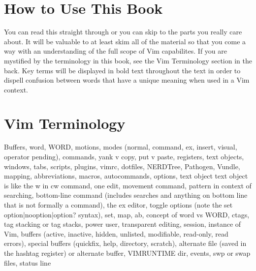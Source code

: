 \documentclass[12pt]{book}
\begin{document}
\section{How to Use This Book}
You can read this straight through or you can skip to the parts you really care about.
It will be valuable to at least skim all of the material so that you come a way with an understanding of the full scope of Vim capabilites.
If you are mystified by the terminology in this book, see the Vim Terminology section in the back.
Key terms will be displayed in bold text throughout the text in order to dispell confusion between words that have a unique meaning when used in a Vim context.

\section{Vim Terminology}
Buffers, word, WORD, motions, modes (normal, command, ex, insert, visual, operator pending), commands, yank v copy, put v paste, registers, text objects, windows, tabs, scripts, plugins, vimrc, dotfiles,
NERDTree, Pathogen, Vundle, mapping, abbreviations, macros, autocommands, options, text object text object is like the w in cw command, one edit, movement command, pattern in context of
searching, bottom-line command (includes searches and anything on bottom line that is not formally a command), the ex editor, toggle options (note the set option|nooption|option? syntax),
set, map, ab, concept of word vs WORD, ctags, tag stacking or tag stacks, power user, transparent editing, session, instance of Vim, buffers (active, inactive, hidden, unlisted, modifiable, read-only,
read errors), special buffers (quickfix, help, directory, scratch), alternate file (saved in the hashtag register) or alternate buffer, VIMRUNTIME dir, events, swp or swap files, status line
\end{document}
